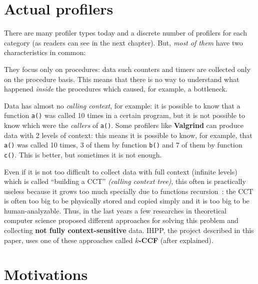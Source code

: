 \documentclass[a4paper,10pt]{report}
\begin{document}
\section{Actual profilers}

There are many profiler types today and a discrete number of profilers for
each category (as readers can see in the next chapter). But, \emph{most of them}
have two characteristics in common:

\begin{itemize*}

\item They focus only on procedures: data such counters and timers are collected
only on the procedure basis. This means that there is no way to understand what
happened \emph{inside} the procedures which caused, for example, a bottleneck.

\item Data has almost no \emph{calling context}, for example: it is possible to know that
a function \verb|a()| was called 10 times in a certain program, but it is not possible to know which were the \emph{callers} of \verb|a()|. Some profilers like \textbf{Valgrind} can
produce data with 2 levels of context: this means it is possible to know, for
example, that \verb|a()| was called 10 times, 3 of them by function
\verb|b()| and 7 of them by function \verb|c()|. This is better, but sometimes
it is not enough.

\end{itemize*}

Even if it is not too difficult to collect data with full context (infinite
levels) which is called ``building a CCT'' \emph{(calling context
tree)}, this often is practically useless because it grows too much specially due to
functions recursion~\cite{kccf}: the CCT is often too big to be physically stored and copied
simply and it is too big to be human-analyzable.
Thus, in the last years a few researches in theoretical computer science 
proposed different approaches for solving this problem and collecting \textbf{not fully context-sensitive} data. IHPP, the project described in this paper, uses one of these approaches called \textbf{$k$-CCF} (after explained).

\section{Motivations}
\end{document}

